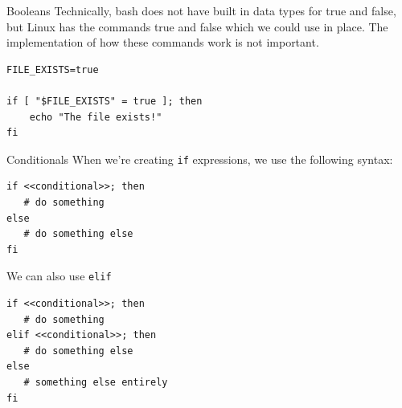 \documentclass[10pt]{beamer}
\begin{document}
\begin{frame}[label={sec:org0b0329b},fragile]{Booleans}
 Technically, bash does not have built in data types for true and false, but
Linux has the commands true and false which we could use in place. The
implementation of how these commands work is not important.

\begin{verbatim}
FILE_EXISTS=true

if [ "$FILE_EXISTS" = true ]; then
    echo "The file exists!"
fi
\end{verbatim}
\end{frame}


\begin{frame}[label={sec:org95f0af8},fragile]{Conditionals}
 When we're creating \texttt{if} expressions, we use the following syntax:

\begin{verbatim}
if <<conditional>>; then
   # do something
else
   # do something else
fi
\end{verbatim}

We can also use \texttt{elif}

\begin{verbatim}
if <<conditional>>; then
   # do something
elif <<conditional>>; then
   # do something else
else
   # something else entirely
fi
\end{verbatim}
\end{frame}
\end{document}
